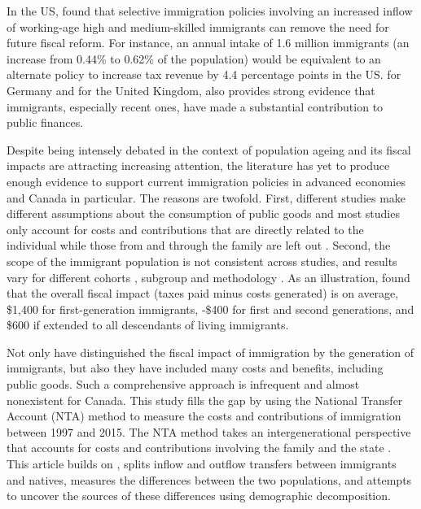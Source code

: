 \vspace{0.7em}\par
In the US, \citet{Storesletten:2000cn} found that selective immigration policies involving an increased inflow of working-age high and medium-skilled immigrants can remove the need for future fiscal reform.
For instance, an annual intake of 1.6 million immigrants (an increase from 0.44\% to 0.62\% of the population) would be equivalent to an alternate policy to increase tax revenue by 4.4 percentage points in the US.
\citet{Akin:2012gh} for Germany and \citet{Dustmann:2014dr} for the United Kingdom, also provides strong evidence that immigrants, especially recent ones, have made a substantial contribution to public finances.

\vspace{0.7em}\par
Despite being intensely debated in the context of population ageing and its fiscal impacts are attracting increasing attention, the literature has yet to produce enough evidence to support current immigration policies in advanced economies and Canada in particular.
The reasons are twofold.
First, different studies make different assumptions about the consumption of public goods \citep{Grubel:2012wo} and most studies only account for costs and contributions that are directly related to the individual while those from and through the family are left out \citep{dAlbis:2019de}.
Second, the scope of the immigrant population is not consistent across studies, and results vary for different cohorts \citep{Grubel:2012wo}, subgroup and methodology \citep{Chojnicki:2011vu}.
As an illustration, \citet{Lee:1998fs} found that the overall fiscal impact (taxes paid minus costs generated) is on average, \$1,400 for first-generation immigrants, -\$400 for first and second generations, and \$600 if extended to all descendants of living immigrants.

Not only have \citet{Lee:1998fs} distinguished the fiscal impact of immigration by the generation of immigrants, but also they have included many costs and benefits, including public goods.
Such a comprehensive approach is infrequent and almost nonexistent for Canada.
This study fills the gap by using the National Transfer Account (NTA) method to measure the costs and contributions of immigration between 1997 and 2015.
The NTA method takes an intergenerational perspective that accounts for costs and contributions involving the family and the state \citep{Mason:2011wc,UnitedNations:2013vz}.
This article builds on \citet{Merette:2019kz}, splits inflow and outflow transfers between immigrants and natives, measures the differences between the two populations, and attempts to uncover the sources of these differences using demographic decomposition.


